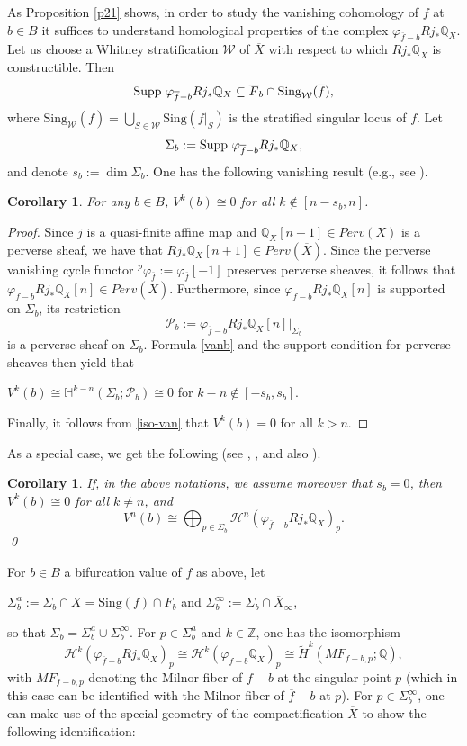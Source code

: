 \documentclass[12pt,leqno,twoside]{amsart}
\newtheorem{corollary}[theorem]{Corollary}
\theoremstyle{remark}
\theoremstyle{remark}
\theoremstyle{definition}
\theoremstyle{remark}
\theoremstyle{remark}
\theoremstyle{remark}
\numberwithin{equation}{section}  %
\def\be{\begin{equation}}
\def\ee{\end{equation}}
\def\bc{\begin{corollary}}
\def\ec{\end{corollary}}
\newcommand{\cH}{\mathcal{H}}
\newcommand{\cP}{\mathcal{P}}
\newcommand{\cW}{\mathcal{W}}
\newcommand{\bH}{\mathbb{H}}
\newcommand{\bQ}{\mathbb{Q}}
\newcommand{\bZ}{\mathbb{Z}}
\newcommand{\of}{\overline{f}}
\newcommand{\oX}{\overline{X}}
\newcommand{\oF}{\overline{F}}
\newcommand{\Sing}{\mathrm{Sing}}
\begin{document}
As Proposition \ref{p21} shows, in order to study the vanishing cohomology of $f$ at $b \in B$ it suffices to understand homological properties of the complex $\varphi_{\overline{f}-b}Rj_*\bQ_X$. Let us choose a Whitney stratification $\cW$ of $\oX$ with respect to which $Rj_*\bQ_X$ is constructible. Then 
\be\label{sup} {\rm Supp} \ \varphi_{\overline{f}-b}Rj_*\bQ_X \subseteq \oF_b \cap \Sing_{\cW}(\of),\ee
where $\Sing_{\cW}(\of)=\bigcup_{S \in \cW} \Sing(\of\vert_S)$ is the stratified singular locus of $\of$. 
Let 
\[\Sigma_b:={\rm Supp} \ \varphi_{\overline{f}-b}Rj_*\bQ_X,\] and denote $s_b:=\dim \Sigma_b$. One has the following vanishing result (e.g., see \cite[Prop.3.1]{Bre}).
\begin{corollary}\label{cor32}
For any $b \in B$, $V^k(b)\cong 0$ for all $k \notin [n-s_b, n]$. 
\end{corollary}
\begin{proof}
Since $j$ is a quasi-finite affine map and $\bQ_X[n+1]\in Perv(X)$ is a perverse sheaf, we have that 
$Rj_*\bQ_X[n+1] \in Perv(\oX)$. Since the perverse vanishing cycle functor $^p\varphi_{\of}:=\varphi_{\of}[-1]$ preserves perverse sheaves, it follows that $\varphi_{\overline{f}-b}Rj_*\bQ_X[n] \in Perv(\oX)$. Furthermore, since $\varphi_{\overline{f}-b}Rj_*\bQ_X[n]$ is supported on $\Sigma_b$, its restriction 
\be\label{pp} \cP_b:=\varphi_{\overline{f}-b}Rj_*\bQ_X[n] \vert_{\Sigma_b} \ee
is a perverse sheaf on $\Sigma_b$. Formula \eqref{vanb} and the support condition for perverse sheaves then yield that
\begin{center} $V^k(b) \cong \bH^{k-n}(\Sigma_b; \cP_b) \cong 0$ for $k-n \notin [-s_b,s_b]$.
\end{center}
Finally,  it follows from \eqref{iso-van} that $V^k(b)=0$ for all $k>n$.
\end{proof}


As a special case, we get the following (see  \cite{ST}, \cite{Hamm}, and also \cite[Prop.6.2.19(i)]{Di}).
\bc\label{iso}
If, in the above notations, we assume moreover that $s_b=0$, then $V^k(b)\cong 0$ for all $k \neq n$, and
\be\label{e23}
V^n(b)\cong \bigoplus_{p\in \Sigma_b} \cH^n(\varphi_{\of-b}Rj_*\bQ_X)_p. 
\ee
\hfill\qed
\ec


For $b \in B$ a bifurcation value of $f$ as above, let 
\begin{center} $\Sigma^a_b:=\Sigma_b \cap X=\Sing(f) \cap F_b$ and $\Sigma_b^\infty:=\Sigma_b \cap \oX_\infty$,\end{center} so that $\Sigma_b=\Sigma^a_b \cup \Sigma_b^\infty$. For $p\in \Sigma^a_b$ and $k \in \bZ$, one has the isomorphism
\be\label{mfa} \cH^k(\varphi_{\of-b}Rj_*\bQ_X)_p \cong \cH^k(\varphi_{f-b}\bQ_X)_p \cong \widetilde{H}^k(MF_{f-b,p};\bQ),\ee
with $MF_{f-b,p}$ denoting the Milnor fiber of $f-b$ at the singular point $p$ (which in this case can be identified with the Milnor fiber of $\of-b$ at $p$). For $p\in \Sigma^\infty_b$, one can make use of the special geometry of the compactification $\oX$ to show the following identification:
\end{document}
